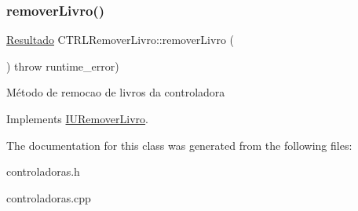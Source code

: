 \subsubsection{\texorpdfstring{remover\+Livro()}{removerLivro()}}
{\footnotesize\ttfamily \hyperlink{classResultado}{Resultado} C\+T\+R\+L\+Remover\+Livro\+::remover\+Livro (\begin{DoxyParamCaption}{ }\end{DoxyParamCaption}) throw  runtime\+\_\+error) \hspace{0.3cm}{\ttfamily [virtual]}}

Método de remocao de livros da controladora 

Implements \hyperlink{classIURemoverLivro}{I\+U\+Remover\+Livro}.



The documentation for this class was generated from the following files\+:\begin{DoxyCompactItemize}
\item 
controladoras.\+h\item 
controladoras.\+cpp\end{DoxyCompactItemize}
